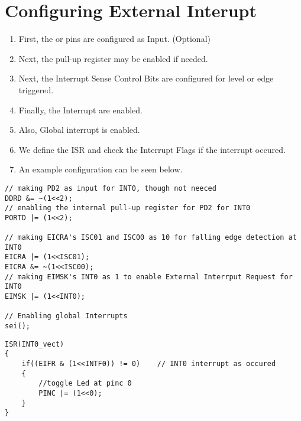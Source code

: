 \section{Configuring External Interupt}
\begin{enumerate}[label=(\Roman*)]
    \item First, the  or  pins are configured as Input. (Optional)
    \item Next, the pull-up register may be enabled if needed.
    \item Next, the Interrupt Sense Control Bits are configured for level or edge triggered.
    \item Finally, the Interrupt are enabled.
    \item Also, Global interrupt is enabled.
    \item We define the ISR and check the Interrupt Flags if the interrupt occured.
    \item An example configuration can be seen below.
\end{enumerate}

\begin{minipage}{0.5\textwidth}
\begin{verbatim}
// making PD2 as input for INT0, though not neeced
DDRD &= ~(1<<2);
// enabling the internal pull-up register for PD2 for INT0
PORTD |= (1<<2);

// making EICRA's ISC01 and ISC00 as 10 for falling edge detection at INT0
EICRA |= (1<<ISC01);
EICRA &= ~(1<<ISC00);
// making EIMSK's INT0 as 1 to enable External Interrput Request for INT0
EIMSK |= (1<<INT0);

// Enabling global Interrupts
sei();	
\end{verbatim}
\end{minipage}
\begin{minipage}{0.45\textwidth}
\begin{verbatim}
ISR(INT0_vect)
{
    if((EIFR & (1<<INTF0)) != 0)	// INT0 interrupt as occured
    {		
        //toggle Led at pinc 0
        PINC |= (1<<0);
    }
}
\end{verbatim}
\end{minipage}


